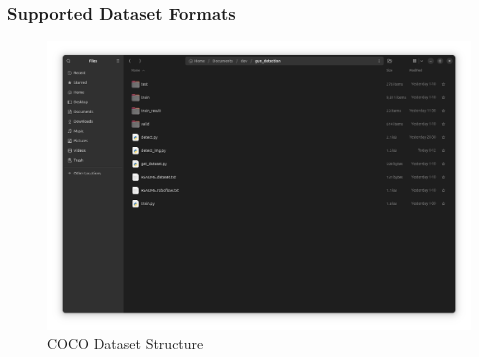         \subsubsection{Supported Dataset Formats}
            \begin{figure}[H]
                \centering
                \includegraphics[width=0.8\linewidth]{img/folder_structure.png}
                \caption{COCO Dataset Structure}
                \label{fig:structure}
            \end{figure}
